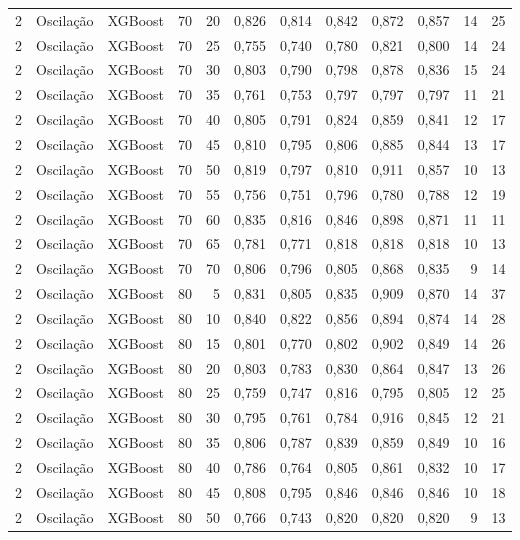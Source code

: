 \begin{longtable}{ccclrrrrrrrr}
2 & Oscilação & XGBoost & 70 & 20 & 0,826 & 0,814 & 0,842 & 0,872 & 0,857 & 14 & 25 \\
2 & Oscilação & XGBoost & 70 & 25 & 0,755 & 0,740 & 0,780 & 0,821 & 0,800 & 14 & 24 \\
2 & Oscilação & XGBoost & 70 & 30 & 0,803 & 0,790 & 0,798 & 0,878 & 0,836 & 15 & 24 \\
2 & Oscilação & XGBoost & 70 & 35 & 0,761 & 0,753 & 0,797 & 0,797 & 0,797 & 11 & 21 \\
2 & Oscilação & XGBoost & 70 & 40 & 0,805 & 0,791 & 0,824 & 0,859 & 0,841 & 12 & 17 \\
2 & Oscilação & XGBoost & 70 & 45 & 0,810 & 0,795 & 0,806 & 0,885 & 0,844 & 13 & 17 \\
2 & Oscilação & XGBoost & 70 & 50 & 0,819 & 0,797 & 0,810 & 0,911 & 0,857 & 10 & 13 \\
2 & Oscilação & XGBoost & 70 & 55 & 0,756 & 0,751 & 0,796 & 0,780 & 0,788 & 12 & 19 \\
2 & Oscilação & XGBoost & 70 & 60 & 0,835 & 0,816 & 0,846 & 0,898 & 0,871 & 11 & 11 \\
2 & Oscilação & XGBoost & 70 & 65 & 0,781 & 0,771 & 0,818 & 0,818 & 0,818 & 10 & 13 \\
2 & Oscilação & XGBoost & 70 & 70 & 0,806 & 0,796 & 0,805 & 0,868 & 0,835 & 9 & 14 \\
2 & Oscilação & XGBoost & 80 & 5 & 0,831 & 0,805 & 0,835 & 0,909 & 0,870 & 14 & 37 \\
2 & Oscilação & XGBoost & 80 & 10 & 0,840 & 0,822 & 0,856 & 0,894 & 0,874 & 14 & 28 \\
2 & Oscilação & XGBoost & 80 & 15 & 0,801 & 0,770 & 0,802 & 0,902 & 0,849 & 14 & 26 \\
2 & Oscilação & XGBoost & 80 & 20 & 0,803 & 0,783 & 0,830 & 0,864 & 0,847 & 13 & 26 \\
2 & Oscilação & XGBoost & 80 & 25 & 0,759 & 0,747 & 0,816 & 0,795 & 0,805 & 12 & 25 \\
2 & Oscilação & XGBoost & 80 & 30 & 0,795 & 0,761 & 0,784 & 0,916 & 0,845 & 12 & 21 \\
2 & Oscilação & XGBoost & 80 & 35 & 0,806 & 0,787 & 0,839 & 0,859 & 0,849 & 10 & 16 \\
2 & Oscilação & XGBoost & 80 & 40 & 0,786 & 0,764 & 0,805 & 0,861 & 0,832 & 10 & 17 \\
2 & Oscilação & XGBoost & 80 & 45 & 0,808 & 0,795 & 0,846 & 0,846 & 0,846 & 10 & 18 \\
2 & Oscilação & XGBoost & 80 & 50 & 0,766 & 0,743 & 0,820 & 0,820 & 0,820 & 9 & 13 \\

\end{longtable}
